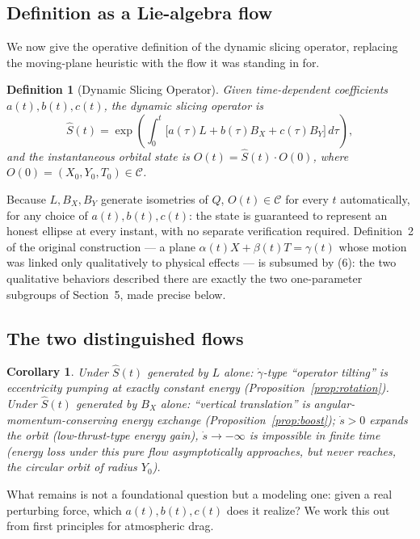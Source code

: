 \documentclass[11pt]{amsart}
\newtheorem{corollary}[theorem]{Corollary}
\newtheorem{definition}[theorem]{Definition}
\begin{document}
\subsection{Definition as a Lie-algebra flow}

We now give the operative definition of the dynamic slicing operator, replacing the moving-plane heuristic with the flow it was standing in for.

\begin{definition}[Dynamic Slicing Operator]
Given time-dependent coefficients $a(t),b(t),c(t)$, the dynamic slicing operator is
\begin{equation}
\hat S(t)=\exp\!\left(\int_0^t\big[a(\tau)L+b(\tau)B_X+c(\tau)B_Y\big]\,d\tau\right), \tag{6}
\end{equation}
and the instantaneous orbital state is $O(t)=\hat S(t)\cdot O(0)$, where $O(0)=(X_0,Y_0,T_0)\in\mathcal C$.
\end{definition}

Because $L,B_X,B_Y$ generate isometries of $Q$, $O(t)\in\mathcal C$ for every $t$ automatically, for any choice of $a(t),b(t),c(t)$: the state is guaranteed to represent an honest ellipse at every instant, with no separate verification required. Definition~2 of the original construction --- a plane $\alpha(t)X+\beta(t)T=\gamma(t)$ whose motion was linked only qualitatively to physical effects --- is subsumed by (6): the two qualitative behaviors described there are exactly the two one-parameter subgroups of Section~5, made precise below.

\subsection{The two distinguished flows}

\begin{corollary}
Under $\hat S(t)$ generated by $L$ alone: $\dot\gamma$-type ``operator tilting'' \emph{is} eccentricity pumping at exactly constant energy (Proposition~\ref{prop:rotation}). Under $\hat S(t)$ generated by $B_X$ alone: ``vertical translation'' \emph{is} angular-momentum-conserving energy exchange (Proposition~\ref{prop:boost}); $\dot s>0$ expands the orbit (low-thrust-type energy gain), $\dot s\to-\infty$ is impossible in finite time (energy loss under this pure flow asymptotically approaches, but never reaches, the circular orbit of radius $Y_0$).
\end{corollary}

What remains is not a foundational question but a modeling one: given a real perturbing force, which $a(t),b(t),c(t)$ does it realize? We work this out from first principles for atmospheric drag.
\end{document}
